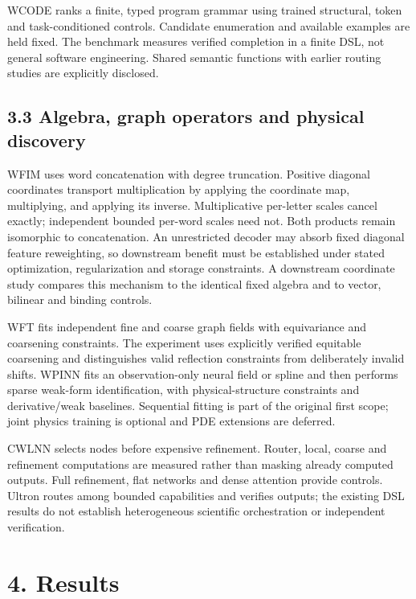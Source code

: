 \documentclass[
]{article}
\begin{document}
WCODE ranks a finite, typed program grammar using trained structural,
token and task-conditioned controls. Candidate enumeration and available
examples are held fixed. The benchmark measures verified completion in a
finite DSL, not general software engineering. Shared semantic functions
with earlier routing studies are explicitly disclosed.

\subsection{3.3 Algebra, graph operators and physical
discovery}\label{algebra-graph-operators-and-physical-discovery}

WFIM uses word concatenation with degree truncation. Positive diagonal
coordinates transport multiplication by applying the coordinate map,
multiplying, and applying its inverse. Multiplicative per-letter scales
cancel exactly; independent bounded per-word scales need not. Both
products remain isomorphic to concatenation. An unrestricted decoder may
absorb fixed diagonal feature reweighting, so downstream benefit must be
established under stated optimization, regularization and storage
constraints. A downstream coordinate study compares this mechanism to
the identical fixed algebra and to vector, bilinear and binding
controls.

WFT fits independent fine and coarse graph fields with equivariance and
coarsening constraints. The experiment uses explicitly verified
equitable coarsening and distinguishes valid reflection constraints from
deliberately invalid shifts. WPINN fits an observation-only neural field
or spline and then performs sparse weak-form identification, with
physical-structure constraints and derivative/weak baselines. Sequential
fitting is part of the original first scope; joint physics training is
optional and PDE extensions are deferred.

CWLNN selects nodes before expensive refinement. Router, local, coarse
and refinement computations are measured rather than masking already
computed outputs. Full refinement, flat networks and dense attention
provide controls. Ultron routes among bounded capabilities and verifies
outputs; the existing DSL results do not establish heterogeneous
scientific orchestration or independent verification.

\section{4. Results}\label{results}
\end{document}
